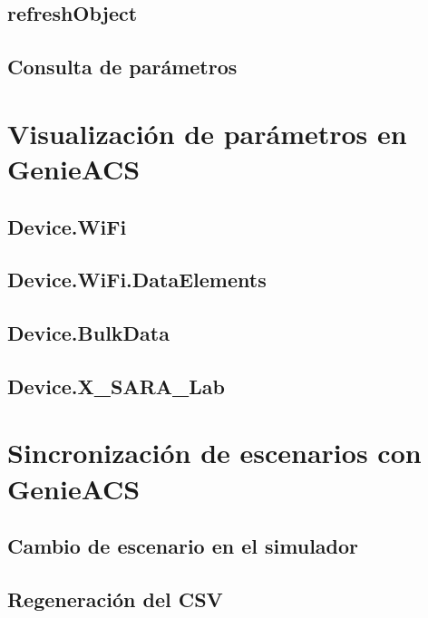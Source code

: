 \subsection{refreshObject}
\label{subsec:refreshobject}

\subsection{Consulta de parámetros}
\label{subsec:consulta-parametros}


\section{Visualización de parámetros en GenieACS}
\label{sec:visualizacion-parametros-genieacs}

\subsection{Device.WiFi}
\label{subsec:device-wifi-genieacs}

\subsection{Device.WiFi.DataElements}
\label{subsec:device-wifi-dataelements-genieacs}

\subsection{Device.BulkData}
\label{subsec:device-bulkdata-genieacs}

\subsection{Device.X\_SARA\_Lab}
\label{subsec:device-xsara-lab-genieacs}


\section{Sincronización de escenarios con GenieACS}
\label{sec:sincronizacion-escenarios-genieacs}

\subsection{Cambio de escenario en el simulador}
\label{subsec:cambio-escenario-simulador}

\subsection{Regeneración del CSV}
\label{subsec:regeneracion-csv}

